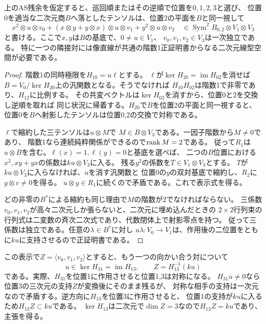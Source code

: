 \begin{proposition}\label{prop:forced-binary-endpoint-pencil}
上のAS残余を仮定すると、巡回順またはその逆順で位置を$0,1,2,3$と選び、
位置0を適当な二次元商$B$へ落としたテンソルは、位置2の平面を$B$と同一視して
\[
 x^2\otimes u\otimes v_0+
 (x\otimes y+y\otimes x)\otimes u\otimes v_1+
 y^2\otimes u\otimes v_2
 \quad\in\operatorname{Sym}^2 B_{0,2}\otimes V_1\otimes V_3
\]
と書ける。ここで$x,y$は$B$の基底で、$0\ne u\in V_1$、
$v_0,v_1,v_2\in V_3$は一次独立である。
特に一つの隣接対には像直線が共通の階数1正証明書からなる二次元線型空間が必要である。
\end{proposition}
\begin{proof}
階数1の同時極限を$H_{10}=u\ell$とする。
$\ell$が$\ker H_{20}=\operatorname{im} H_{02}$を消せば
$B=V_0/\ker H_{20}$上の汎関数となる。そうでなければ
$H_{10}H_{02}$は階数1で非零であり、$H_{12}$に比例する。
その共変ベクトルは$\ker H_{02}$を消すから、位置0と2を交換し逆順を取れば
同じ状況に帰着する。$H_{20}$で$B$を位置2の平面と同一視すると、
位置0を$B$へ射影したテンソルは位置0,2の交換で対称である。

$\ell$で縮約した三テンソルは$u\otimes M$で
$M\in B\otimes V_3$である。一因子階数から$M\ne0$であり、
階数1なら連続純粋関係ができるので$\operatorname{rank} M=2$である。
従って$R_1$は$u\otimes B$を含む。$\ell(x)=1,\ell(y)=0$と基底を選べば、
二つの$B$位置における$x^2,xy+yx$の係数は$ku\otimes V_3$に入る。
残る$y^2$の係数を$T\in V_1\otimes V_3$とする。
$T$が$ku\otimes V_3$に入らなければ、$u$を消す汎関数と
位置0の$y$の双対基底で縮約し、$R_2$に$y\otimes v\ne0$を得る。
$u\otimes y\in R_1$に続くので矛盾である。これで表示式を得る。

どの非零の$B^*$による縮約も同じ理由で$M$の階数が2でなければならない。
三係数$v_0,v_1,v_2$が高々二次元しか張らないと、二次元に埋め込んだときの
$2\times2$行列束の行列式は二変数の斉次二次式であり、代数閉体上で射影零点を持つ。
従って三係数は独立である。任意の$\lambda\in B^*$に対し
$u\lambda:V_0\to V_1$は、作用後の二位置をともに$ku$に支持させるので正証明書である。
\end{proof}

この表示で$Z=\langle v_0,v_1,v_2\rangle$とすると、もう一つの向かい合う対について
\[
 u\in\ker H_{31}=\operatorname{im}H_{13},\qquad Z=H_{13}^{-1}(ku)
\]
である。実際、$H_{31}$を位置1に作用させると位置1,3は対称になる。
$H_{31}u\ne0$なら位置3の三次元の支持$Z$が変換後にそのまま残るが、
対称な相手の支持は一次元なので矛盾する。逆方向に$H_{13}$を位置3に作用させると、
位置1の支持が$ku$に入るため$H_{13}Z\subset ku$である。
$\ker H_{13}$は二次元で$\dim Z=3$なので$H_{13}Z=ku$であり、主張を得る。

